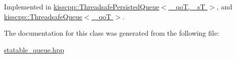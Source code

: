 Implemented in \hyperlink{a00045_ad534f615da86716d4cf8a10d32fe11ce}{kisscpp\-::\-Threadsafe\-Persisted\-Queue$<$ \-\_\-qo\-T, \-\_\-s\-T $>$}, and \hyperlink{a00046_a8c89a9c02a8a05ae2336f27b57502c87}{kisscpp\-::\-Threadsafe\-Queue$<$ \-\_\-qo\-T $>$}.



The documentation for this class was generated from the following file\-:\begin{DoxyCompactItemize}
\item 
\hyperlink{a00080}{statable\-\_\-queue.\-hpp}\end{DoxyCompactItemize}
